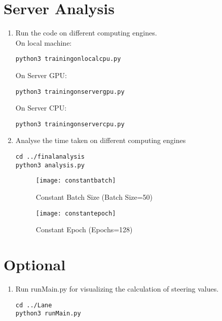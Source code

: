 \documentclass[journal,12pt,twocolumn]{IEEEtran}
\numberwithin{equation}{section}
\renewcommand\thesection{\arabic{section}}
\begin{document}
\section{Server Analysis}
\begin{enumerate}[label=\thesection.\arabic*.,ref=\thesection.\theenumi]
\item Run the code on different computing engines.\\
On local machine:
\begin{lstlisting}
python3 trainingonlocalcpu.py
\end{lstlisting}
On Server GPU:
\begin{lstlisting}
python3 trainingonservergpu.py
\end{lstlisting}  
On Server CPU:
\begin{lstlisting}
python3 trainingonservercpu.py
\end{lstlisting}
\item Analyse the time taken on different computing engines
\begin{lstlisting}
cd ../finalanalysis
python3 analysis.py 
\end{lstlisting}
\begin{figure}[!ht]
\begin{centering}
\texttt{[image: constantbatch]}
\end{centering}
\caption{Constant Batch Size (Batch Size=50)}
\end{figure}
\begin{figure}[!ht]
\begin{centering}
\texttt{[image: constantepoch]}
\end{centering}
\caption{Constant Epoch (Epochs=128)}
\end{figure}
\end{enumerate}
\section{Optional}
\begin{enumerate}[label=\thesection.\arabic*.,ref=\thesection.\theenumi]
\item Run runMain.py for visualizing the calculation of steering values.
\begin{lstlisting}
cd ../Lane
python3 runMain.py
\end{lstlisting}
\end{enumerate}
\end{document}
